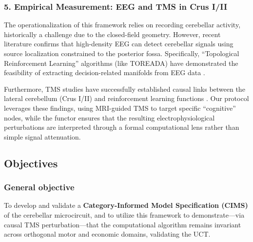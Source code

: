 \documentclass{article}
\begin{document}
	\subsubsection*{5. Empirical Measurement: EEG and TMS in Crus I/II}
	The operationalization of this framework relies on recording cerebellar activity, historically a challenge due to the closed-field geometry. However, recent literature confirms that high-density EEG can detect cerebellar signals using source localization constrained to the posterior fossa. Specifically, ``Topological Reinforcement Learning'' algorithms (like TOREADA) have demonstrated the feasibility of extracting decision-related manifolds from EEG data \parencite{kalitzinTopologicalReinforcementAdaptive2024}.
	
	Furthermore, TMS studies have successfully established causal links between the lateral cerebellum (Crus I/II) and reinforcement learning functions \parencite{huvermannCerebellarSinglePulseTMS2025}. Our protocol leverages these findings, using MRI-guided TMS to target specific ``cognitive'' nodes, while the functor ensures that the resulting electrophysiological perturbations are interpreted through a formal computational lens rather than simple signal attenuation.
	
	\subsection{Objectives}
	
	\subsubsection*{General objective}
	To develop and validate a \textbf{Category-Informed Model Specification (CIMS)} of the cerebellar microcircuit, and to utilize this framework to demonstrate—via causal TMS perturbation—that the computational algorithm remains invariant across orthogonal motor and economic domains, validating the UCT.
	
\end{document}
